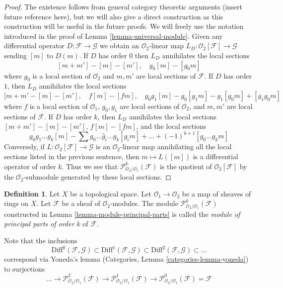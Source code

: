 \documentclass{stacks-project}
\theoremstyle{plain}
\theoremstyle{definition}
\newtheorem{definition}[subsection]{Definition}
\theoremstyle{remark}
\numberwithin{equation}{subsection}
\begin{document}
\begin{proof}
The existence follows from general category theoretic arguments
(insert future reference here), but we will also give a direct
construction as this construction will be useful in the future proofs.
We will freely use the notation introduced in the proof of
Lemma \ref{lemma-universal-module}.
Given any differential operator $D : \mathcal{F} \to \mathcal{G}$
we obtain an $\mathcal{O}_2$-linear map
$L_D : \mathcal{O}_2[\mathcal{F}] \to \mathcal{G}$
sending $[m]$ to $D(m)$. If $D$ has order $0$
then $L_D$ annihilates the local sections
$$
[m + m'] - [m] - [m'],\quad
g_0[m] - [g_0m]
$$
where $g_0$ is a local section of $\mathcal{O}_2$ and $m, m'$
are local sections of $\mathcal{F}$. If $D$ has order $1$, then $L_D$
annihilates the local sections
$$
[m + m' - [m] - [m'],\quad
f[m] - [fm], \quad
g_0g_1[m] - g_0[g_1m] - g_1[g_0m] + [g_1g_0m]
$$
where $f$ is a local section of $\mathcal{O}_1$,
$g_0, g_1$ are local sections of $\mathcal{O}_2$, and
$m, m'$ are local sections of $\mathcal{F}$.
If $D$ has order $k$, then $L_D$ annihilates the local sections
$[m + m'] - [m] - [m']$, $f[m] - [fm]$, and the local sections
$$
g_0g_1\ldots g_k[m] - \sum g_0 \ldots \hat g_i \ldots g_k[g_im] + \ldots
+(-1)^{k + 1}[g_0\ldots g_km]
$$
Conversely, if $L : \mathcal{O}_2[\mathcal{F}] \to \mathcal{G}$ is an
$\mathcal{O}_2$-linear map annihilating all the local sections
listed in the previous sentence, then $m \mapsto L([m])$ is a
differential operator of order $k$. Thus we see that
$\mathcal{P}^k_{\mathcal{O}_2/\mathcal{O}_1}(\mathcal{F})$
is the quotient of $\mathcal{O}_2[\mathcal{F}]$
by the $\mathcal{O}_2$-submodule generated by these local sections.
\end{proof}

\begin{definition}
\label{definition-module-principal-parts}
Let $X$ be a topological space.
Let $\mathcal{O}_1 \to \mathcal{O}_2$ be a map of sheaves of rings on $X$.
Let $\mathcal{F}$ be a sheaf of $\mathcal{O}_2$-modules.
The module $\mathcal{P}^k_{\mathcal{O}_2/\mathcal{O}_1}(\mathcal{F})$
constructed in Lemma \ref{lemma-module-principal-parts}
is called the {\it module of principal parts of order $k$} of $\mathcal{F}$.
\end{definition}

\noindent
Note that the inclusions
$$
\text{Diff}^0(\mathcal{F}, \mathcal{G}) \subset
\text{Diff}^1(\mathcal{F}, \mathcal{G}) \subset
\text{Diff}^2(\mathcal{F}, \mathcal{G}) \subset \ldots
$$
correspond via Yoneda's lemma (Categories, Lemma \ref{categories-lemma-yoneda})
to surjections
$$
\ldots \to \mathcal{P}^2_{\mathcal{O}_2/\mathcal{O}_1}(\mathcal{F})
\to \mathcal{P}^1_{\mathcal{O}_2/\mathcal{O}_1}(\mathcal{F})
\to \mathcal{P}^0_{\mathcal{O}_2/\mathcal{O}_1}(\mathcal{F}) = \mathcal{F}
$$
\end{document}
